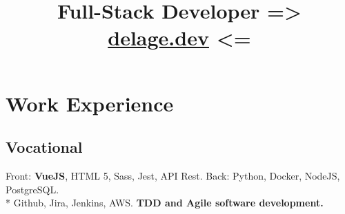 \documentclass[11pt,a4paper,sans]{moderncv}
\title{Full-Stack Developer => \href{https://delage.dev/} {delage.dev} <=}
\begin{document}
\makecvtitle

\section{Work Experience}
\subsection{Vocational}

{{ Front: \textbf{VueJS}, HTML 5, Sass, Jest, API Rest. Back: Python, Docker, NodeJS, PostgreSQL. \\* Github, Jira, Jenkins, AWS. \textbf{TDD and Agile software development.}} \href{https://www.deepreach.com/} {}}
\end{document}
